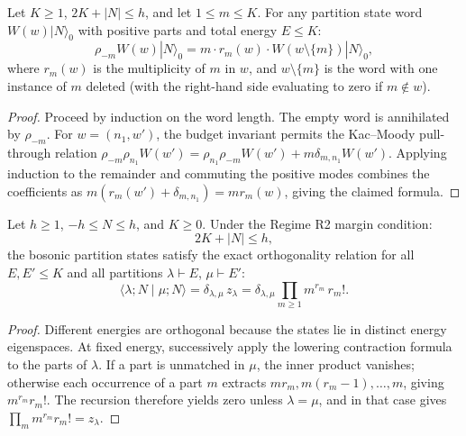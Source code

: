 \begin{lemma}
\label{lem:lowering_contraction}
Let $K \ge 1$, $2K + |N| \le h$, and let $1 \le m \le K$.
For any partition state word $W(w) |N\rangle_0$ with positive parts and total energy $E \le K$:
\begin{equation}
\rho_{-m} W(w) |N\rangle_0 = m \cdot r_m(w) \cdot W(w \setminus \{m\}) |N\rangle_0,
\end{equation}
where $r_m(w)$ is the multiplicity of $m$ in $w$, and $w \setminus \{m\}$ is the word with one instance of $m$ deleted (with the right-hand side evaluating to zero if $m \notin w$).
\end{lemma}

\begin{proof}
Proceed by induction on the word length. The empty word is annihilated by
$\rho_{-m}$. For $w=(n_1,w')$, the budget invariant permits the
Kac--Moody pull-through relation
$\rho_{-m}\rho_{n_1}W(w')=\rho_{n_1}\rho_{-m}W(w')+
 m\delta_{m,n_1}W(w')$. Applying induction to the remainder and
commuting the positive modes combines the coefficients as
$m(r_m(w')+\delta_{m,n_1})=m r_m(w)$, giving the claimed formula.
\end{proof}

\begin{theorem}
\label{thm:hall_gram}
Let $h \ge 1$, $-h \le N \le h$, and $K \ge 0$. Under the Regime R2 margin condition:
\begin{equation}
2K + |N| \le h,
\end{equation}
the bosonic partition states satisfy the exact orthogonality relation for all $E, E' \le K$ and all partitions $\lambda \vdash E$, $\mu \vdash E'$:
\begin{equation}
\langle \lambda; N \mid \mu; N \rangle = \delta_{\lambda, \mu}\, z_\lambda = \delta_{\lambda, \mu} \prod_{m \ge 1} m^{r_m}\, r_m!.
\end{equation}
\end{theorem}

\begin{proof}
Different energies are orthogonal because the states lie in distinct
energy eigenspaces. At fixed energy, successively apply the lowering
contraction formula to the parts of $\lambda$. If a part is unmatched
in $\mu$, the inner product vanishes; otherwise each occurrence of a
part $m$ extracts $m r_m,m(r_m-1),\ldots,m$, giving
$m^{r_m}r_m!$. The recursion therefore yields zero unless $\lambda=\mu$,
and in that case gives $\prod_m m^{r_m}r_m!=z_\lambda$.
\end{proof}

